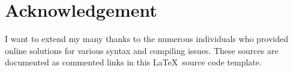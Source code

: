 \section*{Acknowledgement}

I want to extend my many thanks to the numerous individuals who provided online solutions for various syntax and compiling issues. These sources are documented as commented links in this \LaTeX\ source code template.

\clearpage
